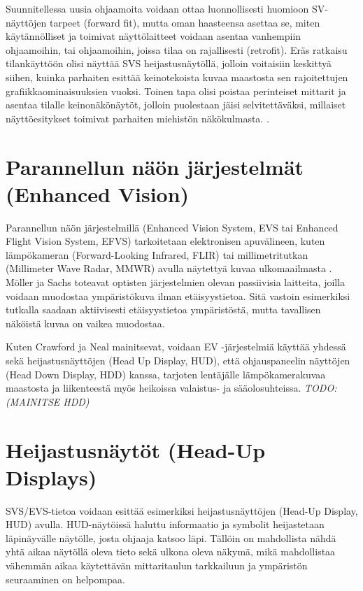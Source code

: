 \documentclass[utf8,bachelor,manualbib]{gradu3}
\begin{document}
Suunnitellessa uusia ohjaamoita voidaan ottaa luonnollisesti huomioon SV-näyttöjen tarpeet (forward fit), mutta oman haasteensa asettaa se, miten käytännölliset ja toimivat näyttölaitteet voidaan asentaa vanhempiin ohjaamoihin, tai ohjaamoihin, joissa tilaa on rajallisesti (retrofit). Eräs ratkaisu tilankäyttöön olisi näyttää SVS heijastusnäytöllä, jolloin voitaisiin keskittyä siihen, kuinka parhaiten esittää keinotekoista kuvaa maastosta sen rajoitettujen grafiikkaominaisuuksien vuoksi. Toinen tapa olisi poistaa perinteiset mittarit ja asentaa tilalle keinonäkönäytöt, jolloin puolestaan jäisi selvitettäväksi, millaiset näyttöesitykset toimivat parhaiten miehistön näkökulmasta. \citep{prinzel2004}.

\section{Parannellun näön järjestelmät (Enhanced Vision)}

Parannellun näön järjestelmillä (Enhanced Vision System, EVS tai Enhanced Flight Vision System, EFVS) tarkoitetaan elektronisen apuvälineen, kuten lämpökameran (Forward-Looking Infrared, FLIR) tai millimetritutkan (Millimeter Wave Radar, MMWR) avulla näytettyä kuvaa ulkomaailmasta \citep{baileyym2007}. Möller ja Sachs \citeyearpar{mollersachs1994} toteavat optisten järjestelmien olevan passiivisia laitteita, joilla voidaan muodostaa ympäristökuva ilman etäisyystietoa. Sitä vastoin esimerkiksi tutkalla saadaan aktiivisesti etäisyystietoa ympäristöstä, mutta tavallisen näköistä kuvaa on vaikea muodostaa.

Kuten Crawford ja Neal \citeyearpar{crawfordneal2006} mainitsevat, voidaan EV -järjestelmiä käyttää yhdessä sekä heijastusnäyttöjen (Head Up Display, HUD), että ohjauspaneelin näyttöjen (Head Down Display, HDD) kanssa, tarjoten lentäjälle lämpökamerakuvaa maastosta ja liikenteestä myös heikoissa valaistus- ja sääolosuhteissa. \emph{TODO: (MAINITSE HDD)}

\section{Heijastusnäytöt (Head-Up Displays)}

SVS/EVS-tietoa voidaan esittää esimerkiksi heijastusnäyttöjen (Head-Up Display, HUD) avulla. HUD-näytöissä haluttu informaatio ja symbolit heijastetaan läpinäyvälle näytölle, josta ohjaaja katsoo läpi. Tällöin on mahdollista nähdä yhtä aikaa näytöllä oleva tieto sekä ulkona oleva näkymä, mikä mahdollistaa vähemmän aikaa käytettävän mittaritaulun tarkkailuun ja ympäristön seuraaminen on helpompaa. \citep{crawfordneal2006}
\end{document}
